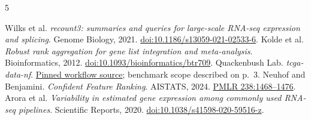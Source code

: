 \documentclass[10pt,letterpaper]{article}
\begin{document}
\vspace{-3pt}
\begin{thebibliography}{5}\footnotesize\raggedright\setlength{\itemsep}{0pt}\setlength{\parskip}{0pt}
 Wilks et al. \emph{recount3: summaries and queries for large-scale RNA-seq expression and splicing}. Genome Biology, 2021. \href{https://doi.org/10.1186/s13059-021-02533-6}{doi:10.1186/s13059-021-02533-6}.
 Kolde et al. \emph{Robust rank aggregation for gene list integration and meta-analysis}. Bioinformatics, 2012. \href{https://doi.org/10.1093/bioinformatics/btr709}{doi:10.1093/bioinformatics/btr709}.
 Quackenbush Lab. \emph{tcga-data-nf}. \href{https://github.com/QuackenbushLab/tcga-data-nf/tree/1069eb9c01b97640fd532ffac8551096d2a2790a}{Pinned workflow source}; benchmark scope described on p.~3.
 Neuhof and Benjamini. \emph{Confident Feature Ranking}. AISTATS, 2024. \href{https://proceedings.mlr.press/v238/neuhof24a.html}{PMLR 238:1468--1476}.
 Arora et al. \emph{Variability in estimated gene expression among commonly used RNA-seq pipelines}. Scientific Reports, 2020. \href{https://doi.org/10.1038/s41598-020-59516-z}{doi:10.1038/s41598-020-59516-z}.
\end{thebibliography}
\end{document}
